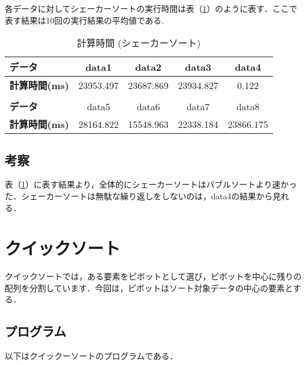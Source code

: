 \documentclass[a4j, titlepage]{jarticle}
\begin{document}
            各データに対してシェーカーソートの実行時間は表（\ref{tab:shacker}）のように表す．ここで表す結果は10回の実行結果の平均値である.

            \begin{table}[tbh]
                \caption{計算時間 (シェーカーソート)}
                \label{tab:shacker}
                \begin{center}
                    \begin{tabular}{lcccc}
                        \hline
                        \textbf{データ} & data1 & data2 &data3 &data4 \\ \hline
                        \textbf{計算時間(ms)} & 23953.497 & 23687.869 & 23934.827 & 0.122 \\ \hline
                        \\ \hline
                        \textbf{データ} & data5 &data6 &data7 &data8\\ \hline
                        \textbf{計算時間(ms)} & 28164.822 & 15548.963 & 22338.184 & 23866.175 \\ \hline
                    \end{tabular}
                \end{center}
            \end{table}
        
        \subsection{考察}
            表（\ref{tab:shacker}）に表す結果より，全体的にシェーカーソートはバブルソートより速かった．シェーカーソートは無駄な繰り返しをしないのは，data4の結果から見れる．
        

        \section{クイックソート}
            クイックソートでは，ある要素をピボットとして選び，ピボットを中心に残りの配列を分割しています．今回は，ピボットはソート対象データの中心の要素とする．

        \subsection{プログラム}
            以下はクイックーソートのプログラムである．
            
\end{document}
